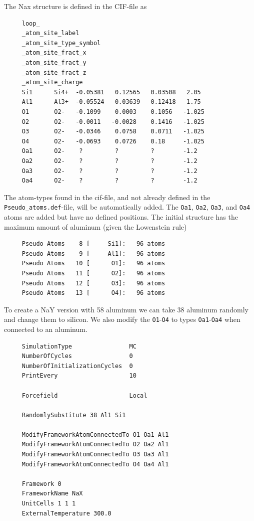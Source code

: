 The Nax structure is defined in the CIF-file as
\begin{tiny}
\begin{verbatim}
     loop_
     _atom_site_label
     _atom_site_type_symbol
     _atom_site_fract_x
     _atom_site_fract_y
     _atom_site_fract_z
     _atom_site_charge
     Si1      Si4+  -0.05381   0.12565   0.03508   2.05
     Al1      Al3+  -0.05524   0.03639   0.12418   1.75
     O1       O2-   -0.1099    0.0003    0.1056   -1.025
     O2       O2-   -0.0011   -0.0028    0.1416   -1.025
     O3       O2-   -0.0346    0.0758    0.0711   -1.025
     O4       O2-   -0.0693    0.0726    0.18     -1.025
     Oa1      O2-    ?         ?         ?        -1.2
     Oa2      O2-    ?         ?         ?        -1.2
     Oa3      O2-    ?         ?         ?        -1.2
     Oa4      O2-    ?         ?         ?        -1.2
\end{verbatim}
\end{tiny}
The atom-types found in the cif-file, and not already defined in the \verb+Pseudo_atoms.def+-file, will be automatically added.
The \verb+Oa1+, \verb+Oa2+, \verb+Oa3+, and \verb+Oa4+ atoms are added but have no defined positions.
The initial structure has the maximum amount of aluminum (given the Lowenstein rule)
\begin{tiny}
\begin{verbatim}
     Pseudo Atoms    8 [     Si1]:   96 atoms
     Pseudo Atoms    9 [     Al1]:   96 atoms
     Pseudo Atoms   10 [      O1]:   96 atoms
     Pseudo Atoms   11 [      O2]:   96 atoms
     Pseudo Atoms   12 [      O3]:   96 atoms
     Pseudo Atoms   13 [      O4]:   96 atoms
\end{verbatim}
\end{tiny}
To create a NaY version with 58 aluminum we can take 38 aluminum randomly and change them to silicon.
We also modify the \verb+O1+-\verb+O4+ to types \verb+Oa1+-\verb+Oa4+ when connected to an aluminum.
\begin{tiny}
\begin{verbatim}
     SimulationType                MC
     NumberOfCycles                0
     NumberOfInitializationCycles  0
     PrintEvery                    10

     Forcefield                    Local

     RandomlySubstitute 38 Al1 Si1

     ModifyFrameworkAtomConnectedTo O1 Oa1 Al1
     ModifyFrameworkAtomConnectedTo O2 Oa2 Al1
     ModifyFrameworkAtomConnectedTo O3 Oa3 Al1
     ModifyFrameworkAtomConnectedTo O4 Oa4 Al1

     Framework 0
     FrameworkName NaX
     UnitCells 1 1 1
     ExternalTemperature 300.0
\end{verbatim}
\end{tiny}
